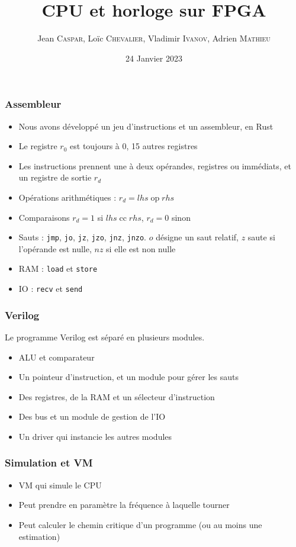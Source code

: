 \documentclass{beamer}
\title{CPU et horloge sur FPGA}
\author{
  Jean \textsc{Caspar},
  Loïc \textsc{Chevalier},
  Vladimir \textsc{Ivanov},
  Adrien \textsc{Mathieu}
}
\date{24 Janvier 2023}
\begin{document}
\frame{\titlepage}

\begin{frame}
    \frametitle{Assembleur}
    \begin{itemize}
        \item Nous avons développé un jeu d'instructions et un assembleur, en Rust
        \item Le registre $r_0$ est toujours à $0$, 15 autres registres
        \item Les instructions prennent une à deux opérandes, registres ou immédiats, et un
              registre de sortie $r_d$
        \item Opérations arithmétiques : $r_d = lhs \operatorname{op} rhs$
        \item Comparaisons $r_d = 1$ si $lhs \operatorname{cc} rhs$, $r_d = 0$ sinon
        \item Sauts : \verb|jmp|, \verb|jo|, \verb|jz|, \verb|jzo|, \verb|jnz|, \verb|jnzo|.
              $o$ désigne un saut relatif, $z$ saute si l'opérande est nulle, $nz$ si elle est non nulle
        \item RAM : \verb|load| et \verb|store|
        \item IO : \verb|recv| et \verb|send|
         
    \end{itemize}
\end{frame}

\begin{frame}
    \frametitle{Verilog}
    Le programme Verilog est séparé en plusieurs modules.
    \begin{itemize}
        \item ALU et comparateur
        \item Un pointeur d'instruction, et un module pour gérer les sauts
        \item Des registres, de la RAM et un sélecteur d'instruction
        \item Des bus et un module de gestion de l'IO
        \item Un driver qui instancie les autres modules
    \end{itemize}
\end{frame}

\begin{frame}
    \frametitle{Simulation et VM}
    \begin{itemize}
        \item VM qui simule le CPU
        \item Peut prendre en paramètre la fréquence à laquelle tourner
        \item Peut calculer le chemin critique d'un programme (ou au moins une estimation)
    \end{itemize}
\end{frame}
\end{document}
